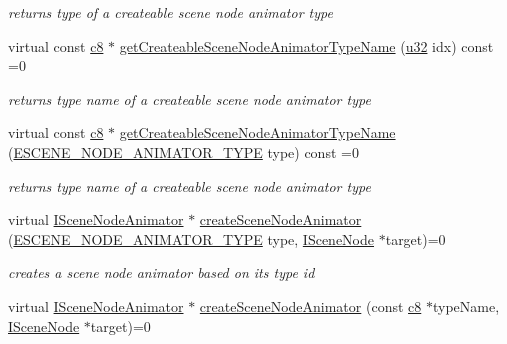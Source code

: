 \begin{DoxyCompactItemize}
\begin{DoxyCompactList}\small\item\em returns type of a createable scene node animator type \end{DoxyCompactList}\item 
virtual const \hyperlink{namespaceirr_a9395eaea339bcb546b319e9c96bf7410}{c8} $\ast$ \hyperlink{classirr_1_1scene_1_1ISceneNodeAnimatorFactory_af33905c1ad6cd478bfbcbda33c82e3bd}{get\+Createable\+Scene\+Node\+Animator\+Type\+Name} (\hyperlink{namespaceirr_a0416a53257075833e7002efd0a18e804}{u32} idx) const =0
\begin{DoxyCompactList}\small\item\em returns type name of a createable scene node animator type \end{DoxyCompactList}\item 
virtual const \hyperlink{namespaceirr_a9395eaea339bcb546b319e9c96bf7410}{c8} $\ast$ \hyperlink{classirr_1_1scene_1_1ISceneNodeAnimatorFactory_a905e896d9fbb0821dd4bf4214b786116}{get\+Createable\+Scene\+Node\+Animator\+Type\+Name} (\hyperlink{namespaceirr_1_1scene_a327a1e43872705cf8f3f3342fb307d19}{E\+S\+C\+E\+N\+E\+\_\+\+N\+O\+D\+E\+\_\+\+A\+N\+I\+M\+A\+T\+O\+R\+\_\+\+T\+Y\+PE} type) const =0
\begin{DoxyCompactList}\small\item\em returns type name of a createable scene node animator type \end{DoxyCompactList}\item 
virtual \hyperlink{classirr_1_1scene_1_1ISceneNodeAnimator}{I\+Scene\+Node\+Animator} $\ast$ \hyperlink{classirr_1_1scene_1_1ISceneNodeAnimatorFactory_a509845a16fa1fdd7241bb10416327eb2}{create\+Scene\+Node\+Animator} (\hyperlink{namespaceirr_1_1scene_a327a1e43872705cf8f3f3342fb307d19}{E\+S\+C\+E\+N\+E\+\_\+\+N\+O\+D\+E\+\_\+\+A\+N\+I\+M\+A\+T\+O\+R\+\_\+\+T\+Y\+PE} type, \hyperlink{classirr_1_1scene_1_1ISceneNode}{I\+Scene\+Node} $\ast$target)=0
\begin{DoxyCompactList}\small\item\em creates a scene node animator based on its type id \end{DoxyCompactList}\item 
virtual \hyperlink{classirr_1_1scene_1_1ISceneNodeAnimator}{I\+Scene\+Node\+Animator} $\ast$ \hyperlink{classirr_1_1scene_1_1ISceneNodeAnimatorFactory_a093f1fb03d8e1c73ff60c8612b0ba778}{create\+Scene\+Node\+Animator} (const \hyperlink{namespaceirr_a9395eaea339bcb546b319e9c96bf7410}{c8} $\ast$type\+Name, \hyperlink{classirr_1_1scene_1_1ISceneNode}{I\+Scene\+Node} $\ast$target)=0

\end{DoxyCompactItemize}
